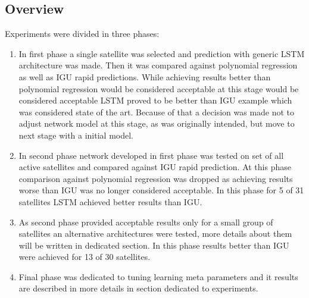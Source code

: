 \documentclass{kybernetika}
\begin{document}
\subsection{Overview}
Experiments were divided in three phases:
\begin{enumerate}
\item In first phase a single satellite was selected and prediction with generic LSTM architecture
	was made. Then it was compared against polynomial regression as well as IGU rapid predictions.
	While achieving results better than polynomial regression would be considered acceptable at 
	this stage would be considered acceptable LSTM proved to be better than IGU example which
	was considered state of the art. Because of that a decision was made not to adjust network
	model at this stage, as was originally intended, but move to next stage with a initial model.

\item In second phase network developed in first phase was tested on set of all active 
	satellites and compared against IGU rapid prediction. At this phase comparison against 
	polynomial regression was dropped as achieving results worse than IGU was no longer 
	considered acceptable. In this phase for 5 of 31 satellites LSTM achieved better 
	results than IGU.

\item As second phase provided acceptable results only for a small group of satellites 
	an alternative architectures were tested, more details about them will be written in 
	dedicated section. In this phase results better than IGU were achieved 
	for 13 of 30 satellites.
\item Final phase was dedicated to tuning learning meta parameters and it results are described
	in more details in section dedicated to experiments.

\end{enumerate}

\end{document}
